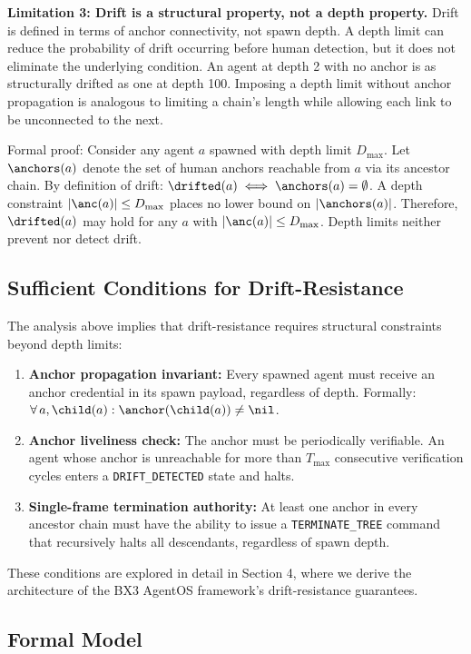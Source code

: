 \medskip
\noindent\textbf{Limitation 3: Drift is a structural property, not a depth property.} Drift is defined in terms of anchor connectivity, not spawn depth. A depth limit can reduce the probability of drift occurring before human detection, but it does not eliminate the underlying condition. An agent at depth 2 with no anchor is as structurally drifted as one at depth 100. Imposing a depth limit without anchor propagation is analogous to limiting a chain's length while allowing each link to be unconnected to the next.

Formal proof: Consider any agent $a$ spawned with depth limit $D_{\max}$. Let $\anchors(a)$ denote the set of human anchors reachable from $a$ via its ancestor chain. By definition of drift: $\drifted(a) \iff \anchors(a) = \emptyset$. A depth constraint $| \anc(a) | \leq D_{\max}$ places no lower bound on $|\anchors(a)|$. Therefore, $\drifted(a)$ may hold for any $a$ with $| \anc(a) | \leq D_{\max}$. Depth limits neither prevent nor detect drift.

\subsection{Sufficient Conditions for Drift-Resistance}

The analysis above implies that drift-resistance requires structural constraints beyond depth limits:

\begin{enumerate}
  \item \textbf{Anchor propagation invariant:} Every spawned agent must receive an anchor credential in its spawn payload, regardless of depth. Formally: $\forall\, a, \child(a): \anchor(\child(a)) \neq \nil$.
  \item \textbf{Anchor liveliness check:} The anchor must be periodically verifiable. An agent whose anchor is unreachable for more than $T_{\max}$ consecutive verification cycles enters a \texttt{DRIFT\_DETECTED} state and halts.
  \item \textbf{Single-frame termination authority:} At least one anchor in every ancestor chain must have the ability to issue a \texttt{TERMINATE\_TREE} command that recursively halts all descendants, regardless of spawn depth.
\end{enumerate}

These conditions are explored in detail in Section 4, where we derive the architecture of the BX3 AgentOS framework's drift-resistance guarantees.

\subsection{Formal Model}

